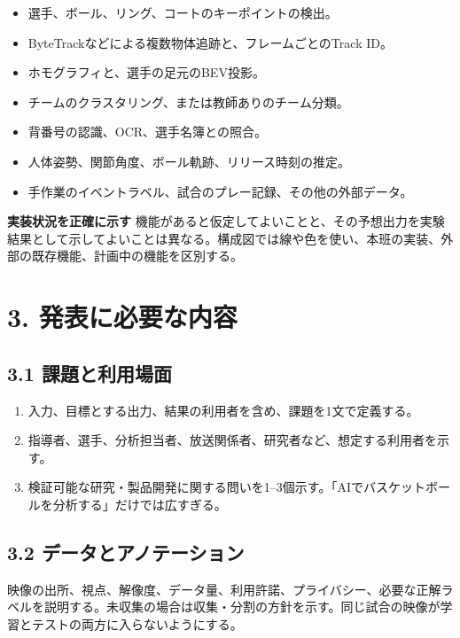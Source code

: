 \documentclass[11pt,a4paper]{article}
\begin{document}
\begin{itemize}[leftmargin=1.6em,itemsep=3pt]
  \item 選手、ボール、リング、コートのキーポイントの検出。
  \item ByteTrackなどによる複数物体追跡と、フレームごとのTrack ID。
  \item ホモグラフィと、選手の足元のBEV投影。
  \item チームのクラスタリング、または教師ありのチーム分類。
  \item 背番号の認識、OCR、選手名簿との照合。
  \item 人体姿勢、関節角度、ボール軌跡、リリース時刻の推定。
  \item 手作業のイベントラベル、試合のプレー記録、その他の外部データ。
\end{itemize}

\begin{tcolorbox}[colback=Accent,colframe=Rule,arc=1mm,boxrule=0.45pt]
\textbf{実装状況を正確に示す}\quad
機能があると仮定してよいことと、その予想出力を実験結果として示してよいことは異なる。構成図では線や色を使い、本班の実装、外部の既存機能、計画中の機能を区別する。
\end{tcolorbox}

\section{3. 発表に必要な内容}

\subsection{3.1 課題と利用場面}

\begin{enumerate}[leftmargin=1.8em,label=\arabic*.,itemsep=3pt]
  \item 入力、目標とする出力、結果の利用者を含め、課題を1文で定義する。
  \item 指導者、選手、分析担当者、放送関係者、研究者など、想定する利用者を示す。
  \item 検証可能な研究・製品開発に関する問いを1--3個示す。「AIでバスケットボールを分析する」だけでは広すぎる。
\end{enumerate}

\subsection{3.2 データとアノテーション}

映像の出所、視点、解像度、データ量、利用許諾、プライバシー、必要な正解ラベルを説明する。未収集の場合は収集・分割の方針を示す。同じ試合の映像が学習とテストの両方に入らないようにする。
\end{document}
